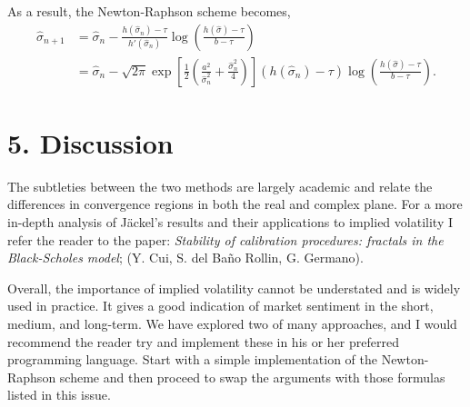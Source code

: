 \documentclass[11pt]{article}
\begin{document}
As a result, the Newton-Raphson scheme becomes,
\begin{align}
    \hat{\sigma}_{n+1} &= \hat{\sigma}_n - \frac{h(\hat{\sigma}_n) - \tau}{h'(\hat{\sigma}_n)} \log \left( \frac{h(\hat{\sigma}) - \tau}{b - \tau} \right) \\
    &= \hat{\sigma}_n - \sqrt{2\pi}\exp \left[ \frac{1}{2} \left( \frac{a^2}{\hat{\sigma}_{n}^{2}} + \frac{\hat{\sigma}_{n}^{2}}{4} \right) \right] (h(\hat{\sigma}_n) - \tau) \log \left( \frac{h(\hat{\sigma}) - \tau}{b - \tau} \right).
\end{align}

\section*{5. Discussion}
The subtleties between the two methods are largely academic and relate the differences in convergence regions in both the real and complex plane. For a more in-depth analysis of Jäckel's results and their applications to implied volatility I refer the reader to the paper: \textit{Stability of calibration
procedures: fractals in the Black-Scholes model}; (Y. Cui, S. del Baño Rollin, G. Germano).

Overall, the importance of implied volatility cannot be understated and is widely used in practice. It gives a good indication of market sentiment in the short, medium, and long-term. We have explored two of many approaches, and I would recommend the reader try and implement these in his or her preferred programming language. Start with a simple implementation of the Newton-Raphson scheme and then proceed to swap the arguments with those formulas listed in this issue. 
\end{document}
